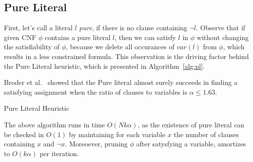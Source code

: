 \documentclass[10pt]{article}
\begin{document}
\subsection{Pure Literal}
\par
First, let's call a literal $l$ \textit{pure}, if there is no clause containing $\neg l$. Observe that if given CNF $\phi$ contains a pure literal $l$, then we can satisfy $l$ in $\phi$ without changing the satisfiability of $\phi$, because we delete all occurances of $var(l)$ from $\phi$, which results in a less constrained formula.
This observation is the driving factor behind the Pure Literal heuristic, which is presented in Algorithm~\ref{alg:pl}. 
\par
Broder et al.~\cite{pureliteral} showed that the Pure literal almost surely succeeds in finding a satisfying assignment when the ratio of clauses to variables is $\alpha \le 1.63$. 
\begin{algorithm}
\caption{Pure Literal Heuristic}\label{alg:pl}
\end{algorithm}
\par
The above algorithm runs in time $O(N k \alpha)$, as the existence of pure literal can be checked in $O(1)$ by maintaining for each variable $x$ the number of clauses containing $x$ and $\neg x$. Moreoever, pruning $\phi$ after satysfying a variable, amortizes to $O(k \alpha)$ per iteration.
\end{document}
